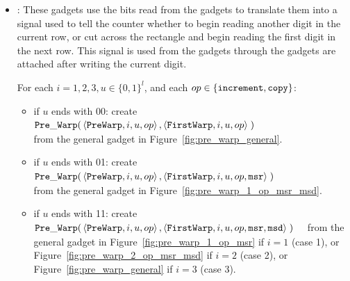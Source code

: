     \begin{itemize}

        \item {\prewarp}: These gadgets use the bits read from the {\cread} gadgets to translate them into
                          a signal used to tell the counter whether to begin reading
                          another digit in the current row, or cut across the rectangle and begin reading the
                          first digit in the next row. This signal is used from the {\prewarp} gadgets through
                          the {\dtop} gadgets are attached after writing the current digit.

            For each $i = 1,2,3, u \in \{0, 1\}^l$, and each $op \in \{ {\tt increment, copy } \}$:
            \begin{itemize}


            \item if $u$ ends with 00:
            create
            $\begin{aligned}[t]
                {\tt Pre\_Warp}(& \left\langle {\tt PreWarp},   i, u, op \right\rangle,
                           \left\langle {\tt FirstWarp}, i, u, op \right\rangle \;)
            \end{aligned}$ \\ from the general gadget in Figure~\ref{fig:pre_warp_general}.

            \item if $u$ ends with 01:
            create
            $\begin{aligned}[t]
                {\tt Pre\_Warp}(& \left\langle {\tt PreWarp},   i, u, op \right\rangle,
                           \left\langle {\tt FirstWarp}, i, u, op, {\tt msr} \right\rangle \;)
            \end{aligned}$ \\ from the general gadget in Figure~\ref{fig:pre_warp_1_op_msr_msd}.


            \item if $u$ ends with 11:
            create
            $\begin{aligned}[t]
                {\tt Pre\_Warp}(& \left\langle {\tt PreWarp},   i, u, op \right\rangle,
                           \left\langle {\tt FirstWarp}, i, u, op, {\tt msr}, {\tt msd} \right\rangle \;)
            \end{aligned}$ from the general gadget in Figure~\ref{fig:pre_warp_1_op_msr} if $i = 1$ (case 1),
            or Figure~\ref{fig:pre_warp_2_op_msr_msd} if $i = 2$ (case 2), or Figure~\ref{fig:pre_warp_general} if $i = 3$ (case 3).
        \end{itemize}
        \vspace{.5cm}


\end{itemize}

